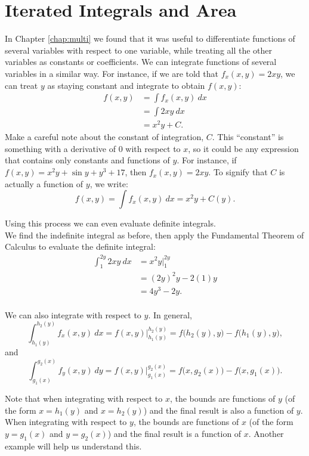 \section{Iterated Integrals and Area}\label{sec:iterated_integrals}

In Chapter \ref{chap:multi} we found that it was useful to differentiate functions of several variables with respect to one variable, while treating all the other variables as constants or coefficients. We can integrate functions of several variables in a similar way. For instance, if we are told that $f_x(x,y) = 2xy$, we can treat $y$ as staying constant and integrate to obtain $f(x,y)$:
\begin{align*}
f(x,y) &= \int f_x(x,y)\ dx\\
				&= \int 2xy\ dx \\
				&= x^2y + C.
\end{align*}
Make a careful note about the constant of integration, $C$. This ``constant'' is something with a derivative of $0$ with respect to $x$, so it could be any expression that contains only constants and functions of $y$. For instance, if $f(x,y) = x^2y+ \sin y + y^3 + 17$, then $f_x(x,y) = 2xy$. To signify that $C$ is actually a function of $y$, we write:
$$f(x,y) = \int f_x(x,y)\ dx  = x^2y+C(y).$$

Using this process we can even evaluate definite integrals.\\

{We find the indefinite integral as before, then apply the Fundamental Theorem of Calculus to evaluate the definite integral:
\begin{align*}
\int_1^{2y} 2xy\ dx &= x^2y\Big|_1^{2y}\\
			&= (2y)^2y - 2(1)y \\
			&= 4y^3-2y.
\end{align*}
\baselineskip
}\\

We can also integrate with respect to $y$. In general,
$$\int_{h_1(y)}^{h_2(y)} f_x(x,y)\ dx = f(x,y)\Big|_{h_1(y)}^{h_2(y)} = f\big(h_2(y),y\big)-f\big(h_1(y),y\big),$$
and
$$\int_{g_1(x)}^{g_2(x)} f_y(x,y)\ dy = f(x,y)\Big|_{g_1(x)}^{g_2(x)} = f\big(x,g_2(x)\big)-f\big(x,g_1(x)\big).$$

Note that when integrating with respect to $x$, the bounds are functions of $y$ (of the form $x=h_1(y)$ and $x=h_2(y)$) and the final result is also a function of $y$. When integrating with respect to $y$, the bounds are functions of $x$ (of the form $y=g_1(x)$ and $y=g_2(x)$) and the final result is a function of $x$. Another example will help us understand this.\\

